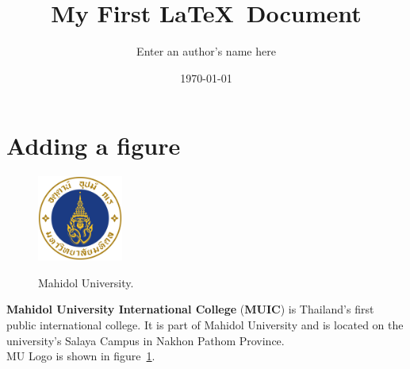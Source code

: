 \documentclass[11pt, a4paper]{article}
\title{My First \LaTeX\ Document}
\author{Enter an author’s name here} %
\date{\today}
\begin{document}
	\maketitle
	\setcounter{section}{3} %
	\section{Adding a figure} 
	\begin{figure}[!h]
		\noindent
		\Centering
		\includegraphics[width=0.25\textwidth]{MU_LOGO_Color}\\
		\caption{Mahidol University.}
		\label{fig:MU Logo}
	\end{figure}
	\noindent\textbf{Mahidol University International College}
	(\textbf{MUIC}) is Thailand's first public international college. It is part of Mahidol University and is located on the university's Salaya Campus in Nakhon Pathom Province.\\
	MU Logo is shown in figure~\ref{fig:MU Logo}.

	\pagebreak
\end{document}
